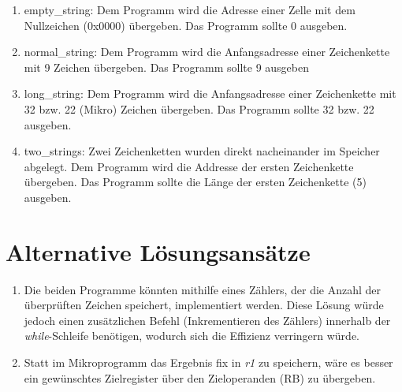 \documentclass[12pt,a4paper]{article}
\begin{document}
\begin{enumerate}
\item empty\_string: Dem Programm wird die Adresse einer Zelle mit dem Nullzeichen (0x0000) übergeben. Das Programm sollte 0 ausgeben.
\item normal\_string: Dem Programm wird die Anfangsadresse einer Zeichenkette mit 9 Zeichen übergeben. Das Programm sollte 9 ausgeben
\item long\_string: Dem Programm wird die Anfangsadresse einer Zeichenkette mit 32 bzw. 22 (Mikro) Zeichen übergeben. Das Programm sollte 32 bzw. 22 ausgeben.
\item two\_strings: Zwei Zeichenketten wurden direkt nacheinander im Speicher abgelegt. Dem Programm wird die Addresse der ersten Zeichenkette übergeben. Das Programm sollte die Länge der ersten Zeichenkette (5) ausgeben.
\end{enumerate}

\section{Alternative Lösungsansätze}
\begin{enumerate}
\item Die beiden Programme könnten mithilfe eines Zählers, der die Anzahl der überprüften Zeichen speichert, implementiert werden. Diese Lösung würde jedoch einen zusätzlichen Befehl (Inkrementieren des Zählers) innerhalb der \emph{while}-Schleife benötigen, wodurch sich die Effizienz verringern würde.
\item Statt im Mikroprogramm das Ergebnis fix in \emph{r1} zu speichern, wäre es besser ein gewünschtes Zielregister über den Zieloperanden (RB) zu übergeben.
\end{enumerate}
\end{document}
